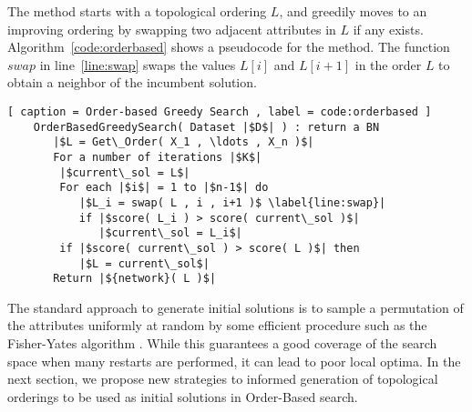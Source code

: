 The method starts with a topological ordering $L$, and greedily moves to an improving ordering by swapping two adjacent attributes in $L$ if any exists. Algorithm~\ref{code:orderbased} shows a pseudocode for the method. The function ${swap}$ in line~\ref{line:swap} swaps the values $L[ i ]$ and $L[ i + 1 ]$ in the order $L$ to obtain a neighbor of the incumbent solution.

\begin{lstlisting}[ caption = Order-based Greedy Search , label = code:orderbased ]
	OrderBasedGreedySearch( Dataset |$D$| ) : return a BN
	   |$L = Get\_Order( X_1 , \ldots , X_n )$|
	   For a number of iterations |$K$|
		|$current\_sol = L$|
		For each |$i$| = 1 to |$n-1$| do
		   |$L_i = swap( L , i , i+1 )$ \label{line:swap}|
		   if |$score( L_i ) > score( current\_sol )$|
		      |$current\_sol = L_i$|
		if |$score( current\_sol ) > score( L )$| then
		   |$L = current\_sol$|
	   Return |${network}( L )$|
\end{lstlisting}

The standard approach to generate initial solutions is to sample a permutation of the attributes uniformly at random by some efficient procedure such as the Fisher-Yates algorithm \cite{FisherYates98}. While this guarantees a good coverage of the search space when many restarts are performed, it can lead to poor local optima. In the next section, we propose new strategies to informed generation of topological orderings to be used as initial solutions in Order-Based search.
